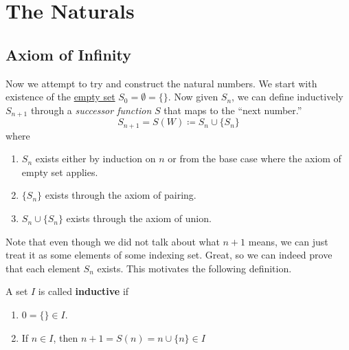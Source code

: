 \section{The Naturals} 

\subsection{Axiom of Infinity}

  Now we attempt to try and construct the natural numbers. We start with existence of the \hyperref[def:empty-set]{empty set} $S_0 = \emptyset = \{\}$. Now given $S_n$, we can define inductively $S_{n+1}$ through a \textit{successor function} $S$ that maps to the ``next number.''
  \begin{equation}
    S_{n+1} = S(W) \coloneqq S_n \cup \{S_n\}
  \end{equation}
  where 
  \begin{enumerate}
    \item $S_n$ exists either by induction on $n$ or from the base case where the axiom of empty set applies. 
    \item $\{S_n\}$ exists through the axiom of pairing. 
    \item $S_n \cup \{S_n\}$ exists through the axiom of union. 
  \end{enumerate} 
  Note that even though we did not talk about what $n+1$ means, we can just treat it as some elements of some indexing set. Great, so we can indeed prove that each element $S_n$ exists. This motivates the following definition. 

  \begin{definition}
    \label{def:inductive-set}
    A set $I$ is called \textbf{inductive} if 
    \begin{enumerate}
      \item $0 = \{\} \in I$. 
      \item If $n \in I$, then $n + 1 = S(n) = n \cup \{n\} \in I$
    \end{enumerate} 
  \end{definition}

